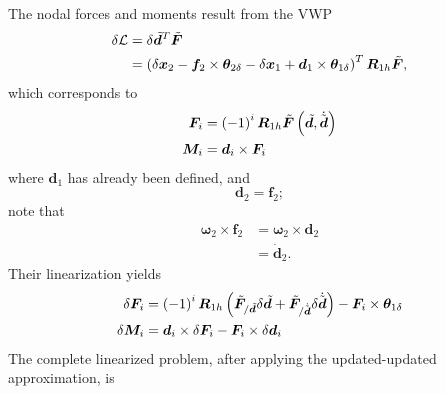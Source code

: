 \documentclass[10pt,fleqn,subeqn]{report}
\newcommand{\T}[1]{\bm{#1}}
\begin{document}
The nodal forces and moments result from the VWP
\begin{align}
	\delta\mathcal{L}
	&= \delta \tilde{\T{d}}^T \tilde{\T{F}} \nonumber \\
	&= \plbr{
		\delta{\T{x}}_2
		- \T{f}_2\times\T{\theta}_{2\delta}
		- \delta{\T{x}}_1
		+ \T{d}_1\times\T{\theta}_{1\delta}
	}^T \T{R}_{1h} \tilde{\T{F}} ,
\end{align}
which corresponds to
\begin{subequations}
\begin{align}
	\T{F}_i &= \plbr{ -1 }^i \T{R}_{1h} \tilde{\T{F}}\plbr{\tilde{\T{d}}, \dot{\tilde{\T{d}}}} \\
	\T{M}_i &= \T{d}_i \times \T{F}_i
\end{align}
\end{subequations}
where $\T{d}_1$ has already been defined, and
\begin{equation}
	\T{d}_2 = \T{f}_2 ;
\end{equation}
note that
\begin{align}
	\T{\omega}_2\times\T{f}_2
	&= \T{\omega}_2\times\T{d}_2 \nonumber \\
	&= \dot{\T{d}}_2 .
\end{align}
Their linearization yields
\begin{subequations}
\begin{align}
	\delta\T{F}_i
	&= \plbr{ -1 }^i \T{R}_{1h} \plbr{
		\tilde{\T{F}}_{/\tilde{\T{d}}} \delta{\tilde{\T{d}}}
		+ \tilde{\T{F}}_{/\dot{\tilde{\T{d}}}} \delta\dot{\tilde{\T{d}}}
	} - \T{F}_i \times \T{\theta}_{1\delta} \\
	\delta\T{M}_i
	&= \T{d}_i \times \delta\T{F}_i
	- \T{F}_i \times \delta \T{d}_i
\end{align}
\end{subequations}
The complete linearized problem, after applying the updated-updated 
approximation, is
\end{document}
